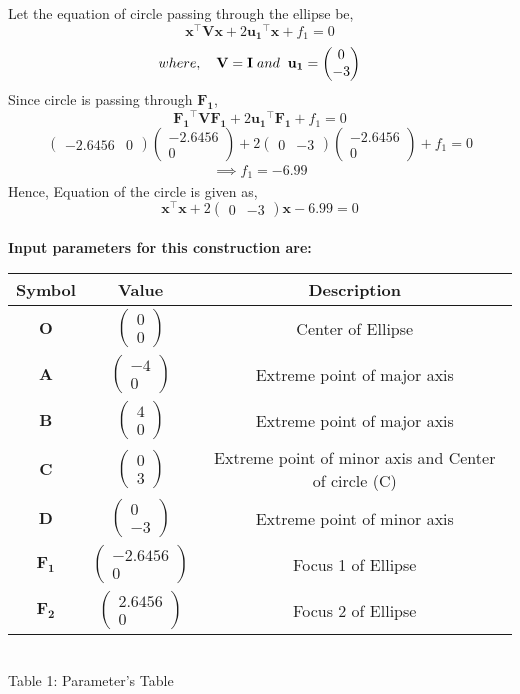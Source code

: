 \documentclass[journal,10pt,twocolumn]{article}
\let\vec\mathbf
\newcommand{\myvec}[1]{\ensuremath{\begin{pmatrix}#1\end{pmatrix}}}
\begin{document}
Let the equation of circle passing through the ellipse be,
\begin{equation}
\vec{x}^{\top}\vec{V}\vec{x}+2\vec{u_1}^{\top}\vec{x}+f_1=0
\label{eq-16-}
\end{equation}
\begin{equation}
where,\hspace{1em}\vec{V} = \vec{I}\hspace{1mm}and\hspace{2mm} \vec{u_1} = \myvec{0 \\ -3}
\end{equation}
Since circle is passing through $\vec{F_1}$,
\begin{equation}
\vec{F_1}^{\top}\vec{V}\vec{F_1}+2\vec{u_1}^{\top}\vec{F_1}+f_1=0 
\label{eq-18-}
\end{equation}
\begin{equation}
\myvec{-2.6456 & 0} \myvec{-2.6456 \\ 0} +  2\myvec{0 & -3}\myvec{-2.6456 \\ 0} +  f_1 = 0 
\end{equation}
\begin{gather*}
\implies f_1 = -6.99
\end{gather*}
Hence, Equation of the circle is given as,
\begin{equation}
\vec{x}^{\top}\vec{x}+2\myvec{0 & -3}\vec{x}-6.99=0
\label{eq-20-}
\end{equation}
\\
\textbf{Input parameters for this construction are:}
\begin{center}
    \setlength{\arrayrulewidth}{0.1mm}
	\setlength{\tabcolsep}{10pt}
	\renewcommand{\arraystretch}{1.5}
\begin{tabular}{|c|c|c|}
	\hline 
    \textbf{Symbol} & \textbf{Value} & \textbf{Description}\\ 		\hline
    $\vec{O}$ & $\myvec{0 \\ 0}$ & Center of Ellipse \\ \hline
    $\vec{A}$ & $\myvec{-4\\0}$ & Extreme point of major axis \\ \hline
    $\vec{B}$ & $\myvec{4\\0}$ & Extreme point of major axis \\ \hline
    $\vec{C}$ & $\myvec{0\\3}$ & Extreme point of minor axis and Center of circle (C) \\ \hline
    $\vec{D}$ & $\myvec{0\\-3}$ & Extreme point of minor axis \\ \hline
    $\vec{F_1}$ &$\myvec{-2.6456\\0}$ & Focus 1 of Ellipse \\ \hline
    $\vec{F_2}$ & $\myvec{2.6456\\0}$ & Focus 2 of Ellipse \\ \hline
\end{tabular}\\ \vspace{2mm}
Table 1: Parameter's Table
\end{center}
\end{document}
